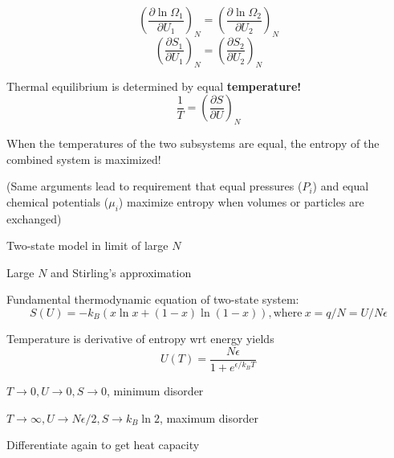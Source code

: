 \documentclass[11pt]{article}
\begin{document}
\begin{outline}
\begin{outline}
\begin{outline}
        \begin{displaymath}
 \left ( \frac{\partial \ln \Omega_1}{\partial U_1} \right )_N = \left ( \frac{\partial \ln \Omega_2}{\partial U_2} \right )_N
        \end{displaymath}
        \begin{displaymath}
 \left ( \frac{\partial S_1}{\partial U_1} \right )_N = \left ( \frac{\partial S_2}{\partial U_2} \right )_N
        \end{displaymath}
      \item Thermal equilibrium is determined by equal {\bf temperature!}
        \begin{displaymath}
            \frac{1}{T}=\left ( \frac{\partial S}{\partial U} \right )_N
          \end{displaymath}
        \item When the temperatures of the two subsystems are equal, the
          entropy of the combined system is maximized!
        \item (Same arguments lead to requirement that equal pressures ($P_i$) and
          equal chemical potentials ($\mu_i$) maximize entropy when volumes or
          particles are exchanged)
        \end{outline}

      \item Two-state model in limit of large $N$
        \begin{outline}
        \item Large $N$ and Stirling's approximation
        \item Fundamental thermodynamic equation of two-state system:
        \begin{displaymath}
          S(U)=-k_B \left ( x \ln x + (1-x) \ln (1-x) \right ), \mathrm{where}\
          x = q/N = U/N\epsilon
        \end{displaymath}
      \item Temperature is derivative of entropy wrt energy yields          
          \begin{displaymath}
            U(T) = \frac{N\epsilon}{1+e^{\epsilon/k_BT}}
          \end{displaymath}
        \begin{outline}
          \item $T \rightarrow 0, U \rightarrow 0, S \rightarrow 0$, minimum disorder
          \item $T \rightarrow \infty, U \rightarrow N\epsilon/2, S \rightarrow
            k_B \ln 2$, maximum disorder
        \end{outline}
      \item Differentiate again to get heat capacity
      \end{outline}


\end{outline}
\end{outline}
\end{document}
